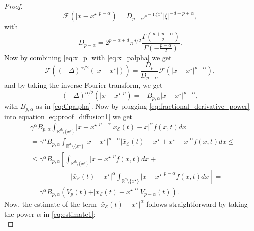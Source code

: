 \documentclass[11pt,handout]{article}%
\numberwithin{equation}{section}
\newcommand{\R}{\mathbb R}
\theoremstyle{definition}
\begin{document}
\begin{proof}
	\begin{equation}\label{eq:x_palpha}
		\mathcal{F}(\vert x-x^\star\vert^{p-\alpha}) = D_{p-\alpha} e^{-\imath \xi x^\star} \vert \xi \vert^{-d-p+\alpha}, 
	\end{equation}
	with 
	\begin{equation*}
		D_{p-\alpha} =  2^{p-\alpha+d} \pi^{d/2} \frac{\Gamma(\frac{d+p-\alpha}{2})}{\Gamma(-\frac{p-\alpha}{2})}.
	\end{equation*}
	Now by combining \eqref{eq:x_p} with \eqref{eq:x_palpha} we get
	\begin{equation*}
		\mathcal{F}((-\Delta)^{\alpha/2} (\vert x-x^\star \vert)) = \frac{D_p}{D_{p-\alpha}} \mathcal{F}(\vert x-x^\star \vert^{p-\alpha}),
	\end{equation*}
	and by taking the inverse Fourier transform, we get  
	\begin{equation}\label{eq:fractional_derivative_power}
		(-\Delta)^{\alpha/2} (\vert x-x^\star\vert^p) = - B_{p,\alpha} \vert x-x^\star \vert^{p-\alpha},
	\end{equation}
	with $B_{p,\alpha} $ as in \eqref{eq:Cpalpha}.
	Now by plugging \eqref{eq:fractional_derivative_power} into equation \eqref{eq:proof_diffusion1} we get 
	\begin{equation*}
		\begin{split}
			& \gamma^\alpha B_{p,\alpha} \int_{\R^d\setminus\{x^\star\}} \vert x-x^\star \vert^{p-\alpha} \vert \bar{x}_\mathcal{E}(t) -x \vert^\alpha f(x,t) dx =  \\
			& = \gamma^\alpha B_{p,\alpha}  \int_{\R^d\setminus\{x^\star\}} \vert x-x^\star \vert^{p-\alpha} \vert \bar{x}_\mathcal{E}(t) - x^\star + x^\star - x \vert^\alpha f(x,t) dx \leq \\
			& \leq \gamma^\alpha B_{p,\alpha}  \left[    \int_{\R^d\setminus\{x^\star\}}  \vert x-x^\star \vert^{p} f(x,t) dx +\right. \\ &\left. \qquad \qquad \quad +\vert \bar{x}_\mathcal{E}(t) - x^\star \vert^\alpha \int_{\R^d\setminus\{x^\star\}} \vert x-x^\star \vert^{p-\alpha} f(x,t) dx \right]=\\
			& = \gamma^\alpha B_{p,\alpha} \left( V_p(t) +\vert \bar{x}_\mathcal{E}(t) - x^\star \vert^\alpha ~ V_{p-\alpha}(t) \right).
		\end{split} 
	\end{equation*}
	Now,  the estimate of the term $\vert \bar{x}_\mathcal{E}(t)-x^\star \vert^\alpha$ follows straightforward by taking the power $\alpha$ in \eqref{eq:estimate1}:
	\begin{equation}

\end{equation}
\end{proof}
\end{document}

